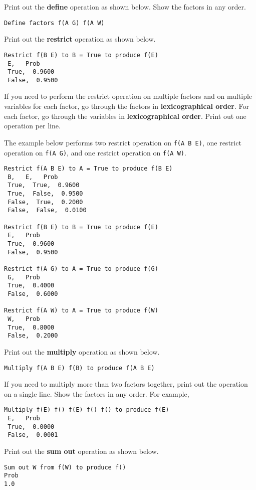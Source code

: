 \documentclass[12pt]{article}
\begin{document}
\begin{appendices}
Print out the {\bf define} operation as shown below. Show the factors in any order.
%
\begin{verbatim}
Define factors f(A G) f(A W)
\end{verbatim}


Print out the {\bf restrict} operation as shown below.  
\begin{verbatim}
Restrict f(B E) to B = True to produce f(E)
 E,   Prob
 True,  0.9600
 False,  0.9500
\end{verbatim}

If you need to perform the restrict operation on multiple factors and on multiple variables for each factor, go through the factors in {\bf lexicographical order}. For each factor, go through the variables in {\bf lexicographical order}. Print out one operation per line. 

The example below performs two restrict operation on \verb+f(A B E)+, one restrict operation on \verb+f(A G)+, and one restrict operation on \verb+f(A W)+.
%
\begin{verbatim}
Restrict f(A B E) to A = True to produce f(B E)
 B,   E,   Prob
 True,  True,  0.9600
 True,  False,  0.9500
 False,  True,  0.2000
 False,  False,  0.0100

Restrict f(B E) to B = True to produce f(E)
 E,   Prob
 True,  0.9600
 False,  0.9500

Restrict f(A G) to A = True to produce f(G)
 G,   Prob
 True,  0.4000
 False,  0.6000

Restrict f(A W) to A = True to produce f(W)
 W,   Prob
 True,  0.8000
 False,  0.2000

\end{verbatim}

Print out the {\bf multiply} operation as shown below.
%
\begin{verbatim}
Multiply f(A B E) f(B) to produce f(A B E)
\end{verbatim}

If you need to multiply more than two factors together, print out the operation on a single line. Show the factors in any order. For example,
%
\begin{verbatim}
Multiply f(E) f() f(E) f() f() to produce f(E)
 E,   Prob
 True,  0.0000
 False,  0.0001
\end{verbatim}


Print out the {\bf sum out} operation as shown below.
%
\begin{verbatim}
Sum out W from f(W) to produce f()
Prob
1.0
\end{verbatim}



\end{appendices}
\end{document}
